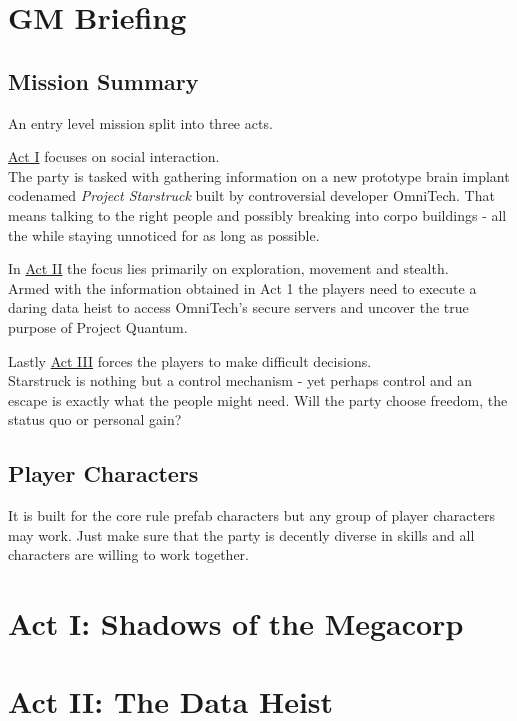 \documentclass[12pt,a4paper,openany]{book}
\begin{document}
	
	
	\chapter{GM Briefing}
	\section{Mission Summary}
	An entry level mission split into three acts.
	\par
		\hyperref[ch:act1]{Act I} focuses on social interaction.\\
		The party is tasked with gathering information on a new prototype brain implant codenamed \emph{Project Starstruck} built by controversial developer OmniTech.
		That means talking to the right people and possibly breaking into corpo buildings
		- all the while staying unnoticed for as long as possible.
	\par
		In \hyperref[ch:act2]{Act II} the focus lies primarily on exploration, movement and stealth.\\
		Armed with the information obtained in Act 1 the players need to execute a daring data heist to access OmniTech's secure servers and uncover the true purpose of Project Quantum.
	\par
		Lastly \hyperref[ch:act3]{Act III} forces the players to make difficult decisions.\\
		Starstruck is nothing but a control mechanism
		- yet perhaps control and an escape is exactly what the people might need.
		Will the party choose freedom, the status quo or personal gain?
	\section{Player Characters}
	It is built for the core rule prefab characters but any group of player characters may work.
	Just make sure that the party is decently diverse in skills and all characters are willing to work together.
	
	\chapter{Act I: Shadows of the Megacorp}
	\label{ch:act1}
	
	\chapter{Act II: The Data Heist}
	\label{ch:act2}
	
\end{document}
